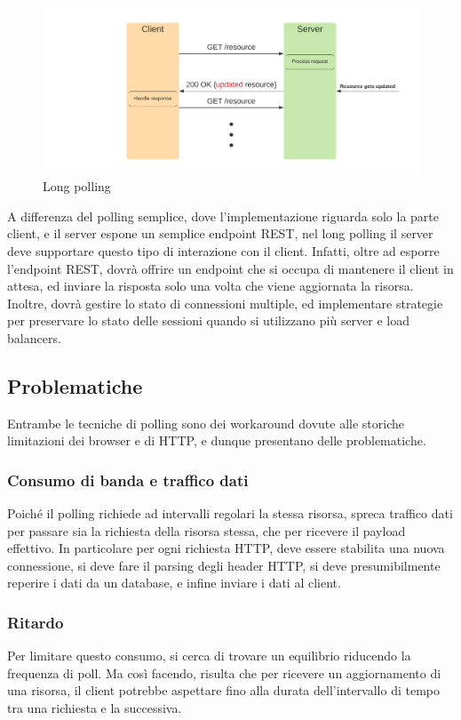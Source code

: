 \documentclass[12pt,a4paper,openright,twoside]{report}
\begin{document}
\begin{description}
\begin{figure}[htbp]
\centering
\includegraphics[width=.8\textwidth]{assets/long_polling.png}
\caption{Long polling}
\end{figure}

A differenza del polling semplice, dove l’implementazione riguarda solo la parte client, e il server espone un semplice endpoint REST, nel long polling il server deve supportare questo tipo di interazione con il client. Infatti, oltre ad esporre l'endpoint REST, dovrà offrire un endpoint che si occupa di mantenere il client in attesa, ed inviare la risposta solo una volta che viene aggiornata la risorsa. Inoltre, dovrà gestire lo stato di connessioni multiple, ed implementare strategie per preservare lo stato delle sessioni quando si utilizzano più server e load balancers.

\end{description}

\subsection{Problematiche}
Entrambe le tecniche di polling sono dei workaround dovute alle storiche limitazioni dei browser e di HTTP, e dunque presentano delle problematiche. 
\subsubsection{Consumo di banda e traffico dati}
Poiché il polling richiede ad intervalli regolari la stessa risorsa, spreca traffico dati per passare sia la richiesta della risorsa stessa, che per ricevere il payload effettivo. In particolare per ogni richiesta HTTP, deve essere stabilita una nuova connessione, si deve fare il parsing degli header HTTP, si deve presumibilmente reperire i dati da un database, e infine inviare i dati al client.

\subsubsection{Ritardo}
Per limitare questo consumo, si cerca di trovare un equilibrio riducendo la frequenza di poll. Ma così facendo, risulta che per ricevere un aggiornamento di una risorsa, il client potrebbe aspettare fino alla durata dell’intervallo di tempo tra una richiesta e la successiva.
\end{document}
